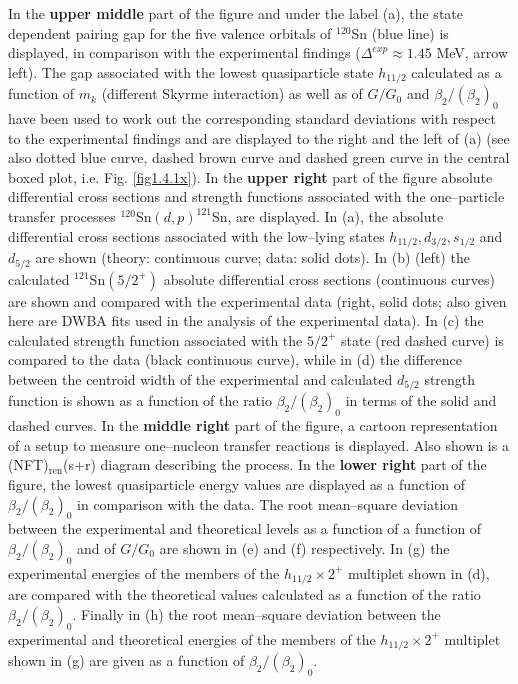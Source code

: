   
  
  In the  \textbf{upper middle} part of the figure and under the label  (a), the state dependent pairing gap for the five valence orbitals of $^{120}$Sn (blue line) is displayed, in comparison with the experimental findings ($\Delta^{exp}\approx1.45$ MeV, arrow left). The gap associated with the lowest quasiparticle state $h_{11/2}$ calculated as a function of $m_k$ (different Skyrme interaction) as well as of $G/G_0$ and $\beta_2/(\beta_2)_0$ have been used to work out the corresponding   standard deviations with respect to the experimental findings and are displayed to the right and the left of (a) (see also dotted blue curve, dashed brown curve and dashed green curve in the central boxed plot, i.e. Fig. \ref{fig1.4.1x}). In the  \textbf{upper right} part of the figure absolute differential cross sections and strength functions associated with the one--particle transfer processes $^{120}$Sn$(d,p)^{121}$Sn, are displayed. In  (a), the absolute differential cross sections associated with the low--lying  states $h_{11/2},d_{3/2},s_{1/2}$ and $d_{5/2}$ are shown (theory: continuous curve; data: solid dots). In (b) (left) the calculated $^{121}$Sn$(5/2^+)$ absolute differential cross sections (continuous curves) are shown and compared with the experimental data (right, solid dots; also given here are DWBA fits used in the analysis of the experimental data). In (c)  the calculated strength function associated with the $5/2^+$ state (red dashed curve) is compared to the data (black continuous curve), while in  (d) the difference between the centroid width of the experimental and calculated $d_{5/2}$ strength function  is shown as a function of the ratio $\beta_2/(\beta_2)_0$ in terms of the solid and dashed curves. In the \textbf{middle right} part of the figure, a cartoon representation of a setup to measure one--nucleon transfer reactions is displayed. Also shown is a (NFT)$_{\text{ren}}$(s+r) diagram  describing the process.  In the \textbf{lower right} part of the figure, the lowest quasiparticle energy values are displayed as a function of $\beta_2/(\beta_2)_0$ in comparison with the data.  The root mean--square deviation between the experimental and theoretical levels as a function of a function of  $\beta_2/(\beta_2)_0$ and  of $G/G_0$ are shown in (e) and (f) respectively. In (g) the  experimental energies of the members of the $h_{11/2}\times 2^+$  multiplet shown in (d), are compared with the theoretical values calculated as a function of the ratio $\beta_2/(\beta_2)_0$. Finally in (h) the root mean--square deviation between the experimental and theoretical energies of the members of the $h_{11/2}\times 2^+$ multiplet shown in (g) are given as a function of $\beta_2/(\beta_2)_0$. 
  
